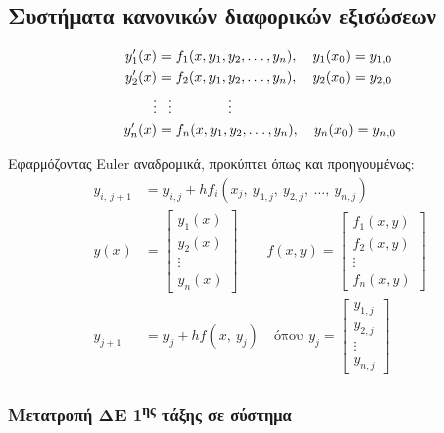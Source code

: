 \documentclass[11pt,a4paper,notitlepage,fleqn,final]{article}
\begin{document}
\subsection{Συστήματα κανονικών διαφορικών εξισώσεων}
\begin{align*}
	y_1'(x)  &= f_1(x,y_1,y_2,\dots,y_n),\quad y_1(x_0) = y_{1,0} \\
	y_2'(x)  &= f_2(x,y_1,y_2,\dots,y_n),\quad y_2(x_0) = y_{2,0} \\
	\vdots &\hphantom{= } \vdots \qquad \qquad \vdots \\
	y_n'(x) &= f_n(x,y_1,y_2,\dots,y_n),\quad y_n(x_0)=y_{n,0}
\end{align*}

Εφαρμόζοντας Euler αναδρομικά, προκύπτει όπως και προηγουμένως:
\begin{align*}
	y_{i,\ j+1} &= y_{i,j}+hf_i(x_j,\ y_{1,j},\ y_{2,j},\ \dots,\
	y_{n,j}) \\
	y(x) &= \left[\begin{matrix}
	y_1(x) \\ y_2(x) \\ \vdots \\ y_n(x)
	\end{matrix}\right] \qquad
	f(x,y) = \left[\begin{matrix}
	f_1(x,y) \\ f_2(x,y) \\ \vdots \\ f_n(x,y)
	\end{matrix}\right] \\
	y_{j+1} &= y_j + hf(x,\ y_j)
	\quad \text{όπου } y_j = \left[\begin{matrix}
	y_{1,j} \\ y_{2,j} \\ \vdots \\ y_{n,j}
	\end{matrix}\right]
\end{align*}

\subsubsection{Μετατροπή ΔΕ 1\textsuperscript{ης} τάξης σε σύστημα}
\end{document}
